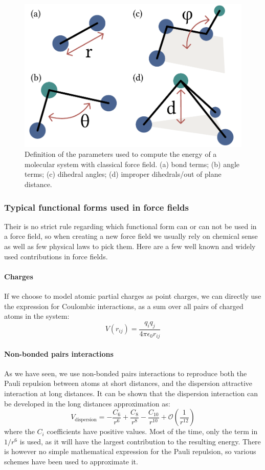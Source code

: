 \documentclass[thesis]{subfiles}
\begin{document}
\begin{figure}[ht]
    \centering
    \includegraphics[width=.6\textwidth]{figures/images/molecular-ff}
    \caption{Definition of the parameters used to compute the energy of a
    molecular system with classical force field. (a) bond terms; (b) angle
    terms; (c) dihedral angles; (d) improper dihedrals/out of plane distance.}
    \label{fig:force-fields:molecular}
\end{figure}

\subsubsection{Typical functional forms used in force fields}

Their is no strict rule regarding which functional form can or can not be used
in a force field, so when creating a new force field we usually rely on
chemical sense as well as few physical laws to pick them. Here are a few well
known and widely used contributions in force fields.

\paragraph{Charges} If we choose to model atomic partial charges as point
charges, we can directly use the expression for Coulombic interactions, as a sum
over all pairs of charged atoms in the system:
\[ V(r_{ij}) = \frac{q_i q_j}{4 \pi \epsilon_0 r_{ij}}\]

\paragraph{Non-bonded pairs interactions} As we have seen, we use non-bonded
pairs interactions to reproduce both the Pauli repulsion between atoms at short
distances, and the dispersion attractive interaction at long distances. It can
be shown\cite{London1930} that the dispersion interaction can be developed in
the long distances approximation as:
\[ V_\text{dispersion} = -\frac{C_6}{r^6} + \frac{C_8}{r^8} - \frac{C_{10}}{r^{10}} + {\scriptstyle\mathcal{O}}\left(\frac{1}{r^{12}}\right) \]
where the $C_i$ coefficients have positive values. Most of the time, only the
term in $1/r^6$ is used, as it will have the largest contribution to the
resulting energy. There is however no simple mathematical expression for the
Pauli repulsion, so various schemes have been used to approximate it.
\end{document}

